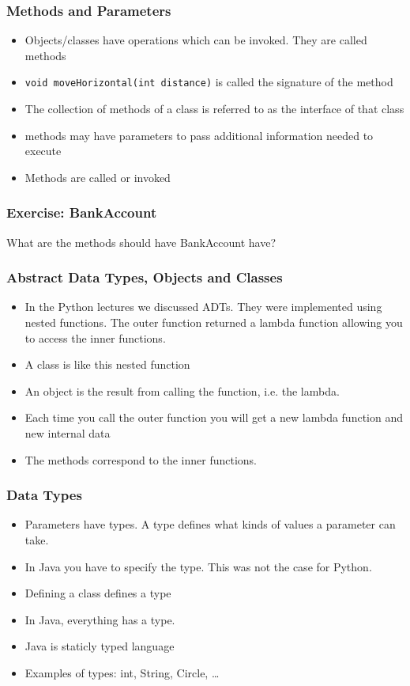 \begin{frame}
\frametitle{Methods and Parameters}
\begin{itemize}
\item Objects/classes have operations which can be invoked. They are called \alert{methods}
\item \lstinline!void moveHorizontal(int distance)! is called the \alert{signature} of the method 
\item The collection of methods of a class is referred to as the \alert{interface} of that class
\item methods may have \alert{parameters} to pass additional information needed to execute
\item Methods are \alert{called} or \alert{invoked}
\end{itemize}
\end{frame}

\begin{frame}
\frametitle{Exercise: BankAccount}
What are the methods should have BankAccount have?
\end{frame}

\begin{frame}
\frametitle{Abstract Data Types, Objects and Classes}
\begin{itemize}
\item In the Python lectures we discussed ADTs. They were implemented using nested functions. The outer function
returned a lambda function allowing you to access the inner functions.
\item A class is like this nested function
\item An object is the result from calling the function, i.e. the lambda.
\item Each time you call the outer function you will get a new lambda function and new internal data
\item The methods correspond to the inner functions.
\end{itemize}
\end{frame}

\begin{frame}
\frametitle{Data Types}
\begin{itemize}
\item Parameters have \alert{types}. A type defines what kinds of values a parameter can take.
\item In Java you have to specify the type. This was not the case for Python.
\item Defining a class defines a type
\item In Java, everything has a type.
\item Java is \alert{staticly typed language}
\item Examples of types: int, String, Circle, \ldots
\end{itemize}
\end{frame}


